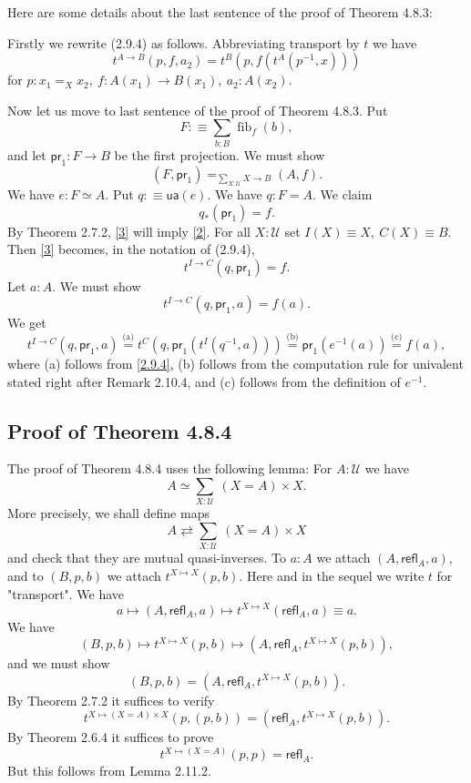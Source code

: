 \documentclass[12pt]{article}
\newcommand{\oo}{\operatorname}
\newcommand{\pr}{\mathsf{pr}}
\newcommand{\refl}{\mathsf{refl}}
\newcommand{\U}{\mathcal U}
\newcommand{\ua}{\mathsf{ua}}
\begin{document}
Here are some details about the last sentence of the proof of Theorem 4.8.3:

Firstly we rewrite (2.9.4) as follows. Abbreviating transport by $t$ we have 
\begin{equation}\label{2.9.4}
t^{A\to B}(p,f,a_2)=t^B(p,f(t^A(p^{-1},x)))
\end{equation}
for $p:x_1=_Xx_2,\ f:A(x_1)\to B(x_1),\ a_2:A(x_2)$. 

Now let us move to last sentence of the proof of Theorem 4.8.3. Put
$$
F:\equiv\sum_{b:B}\oo{fib}_f(b),
$$ 
and let $\pr_1:F\to B$ be the first projection. We must show 
\begin{equation}\label{2}
(F,\pr_1)=_{\sum_{X:\U}X\to B}(A,f).
\end{equation} 
We have $e:F\simeq A$. Put $q:\equiv\ua(e)$. We have $q:F=A$. We claim 
\begin{equation}\label{3}
q_*(\pr_1)=f.
\end{equation} 
By Theorem 2.7.2, \eqref{3} will imply \eqref{2}. For all $X:\U$ set $I(X)\equiv X,\ C(X)\equiv B$. Then \eqref{3} becomes, in the notation of (2.9.4), 
$$
t^{I\to C}(q,\pr_1)=f.
$$ 
Let $a:A$. We must show 
$$
t^{I\to C}(q,\pr_1,a)=f(a).
$$ 
We get 
$$
t^{I\to C}(q,\pr_1,a)\overset{\text{(a)}}=t^C(q,\pr_1(t^I(q^{-1},a)))\overset{\text{(b)}}=\pr_1(e^{-1}(a))\overset{\text{(c)}}=f(a),
$$ 
where (a) follows from \eqref{2.9.4}, (b) follows from the computation rule for univalent stated right after Remark 2.10.4, and (c) follows from the definition of $e^{-1}$.


\subsection{Proof of Theorem 4.8.4}

The proof of Theorem 4.8.4 uses the following lemma: For $A:\U$ we have 
$$
A\simeq\sum_{X:\U}\ (X=A)\times X.
$$
More precisely, we shall define maps 
$$
A\rightleftarrows\sum_{X:\U}\ (X=A)\times X
$$ 
and check that they are mutual quasi-inverses. To $a:A$ we attach $(A,\refl_A,a)$, and to $(B,p,b)$ we attach $t^{X\mapsto X}(p,b)$. Here and in the sequel we write $t$ for "transport". We have 
$$
a\mapsto(A,\refl_A,a)\mapsto t^{X\mapsto X}(\refl_A,a)\equiv a.
$$ 
We have 
$$
(B,p,b)\mapsto t^{X\mapsto X}(p,b)\mapsto(A,\refl_A,t^{X\mapsto X}(p,b)),
$$ 
and we must show 
$$
(B,p,b)=(A,\refl_A,t^{X\mapsto X}(p,b)).
$$ 
By Theorem 2.7.2 it suffices to verify 
$$
t^{X\mapsto (X=A)\times X}(p,(p,b))=(\refl_A,t^{X\mapsto X}(p,b)).
$$ 
By Theorem 2.6.4 it suffices to prove 
$$
t^{X\mapsto (X=A)}(p,p)=\refl_A.
$$ 
But this follows from Lemma 2.11.2. 
\end{document}
